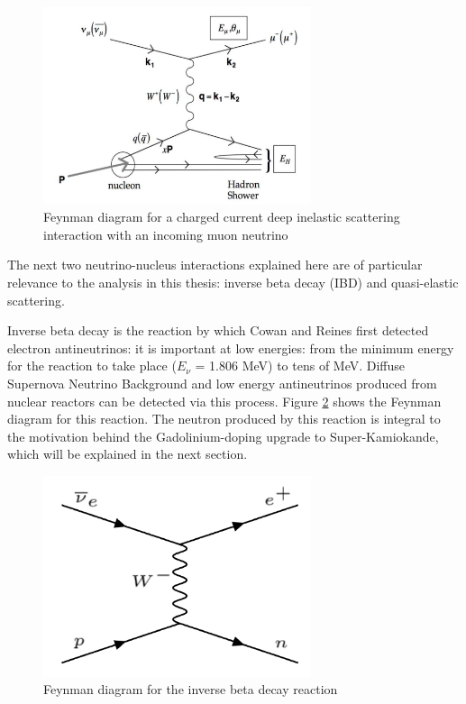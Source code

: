 \begin{figure}
    \centering
    \includegraphics[width=0.7\textwidth]{Figures/CC_DIS.png}
    \caption{Feynman diagram for a charged current deep inelastic scattering interaction with an incoming muon neutrino}
    \label{fig:CC_DIS}
\end{figure}


The next two neutrino-nucleus interactions explained here are of particular relevance to the analysis in this thesis: inverse beta decay (IBD) and quasi-elastic scattering. 

Inverse beta decay is the reaction by which Cowan and Reines first detected electron antineutrinos: it is important at low energies: from the minimum energy for the reaction to take place ($E_{\nu}$ = 1.806 MeV) to tens of MeV. Diffuse Supernova Neutrino Background and low energy antineutrinos produced from nuclear reactors can be detected via this process. Figure \ref{fig:IBD_feynman} shows the Feynman diagram for this reaction. The neutron produced by this reaction is integral to the motivation behind the Gadolinium-doping upgrade to Super-Kamiokande, which will be explained in the next section.

\begin{figure}
    \centering
    \includegraphics[width=0.7\textwidth]{Figures/IBD_feynman.png}
    \caption{Feynman diagram for the inverse beta decay reaction}
    \label{fig:IBD_feynman}
\end{figure}


